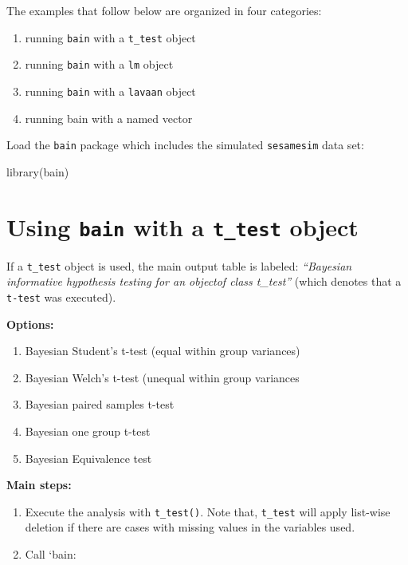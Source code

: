 \documentclass[
]{book}
\newenvironment{Shaded}{\begin{snugshade}}{\end{snugshade}}
\newcommand{\FunctionTok}[1]{\textcolor[rgb]{0.00,0.00,0.00}{#1}}
\newcommand{\NormalTok}[1]{#1}
\providecommand{\tightlist}{%
  \setlength{\itemsep}{0pt}\setlength{\parskip}{0pt}}
\begin{document}
The examples that follow below are organized in four categories:

\begin{enumerate}
\def\labelenumi{\arabic{enumi})}
\tightlist
\item
  running \texttt{bain} with a \texttt{t\_test} object
\item
  running \texttt{bain} with a \texttt{lm} object
\item
  running \texttt{bain} with a \texttt{lavaan} object
\item
  running bain with a named vector
\end{enumerate}

Load the \texttt{bain} package which includes the simulated \texttt{sesamesim} data set:

\begin{Shaded}
\begin{Highlighting}[]
\FunctionTok{library}\NormalTok{(bain)}
\end{Highlighting}
\end{Shaded}

\hypertarget{using-bain-with-a-t_test-object}{%
\section{\texorpdfstring{Using \texttt{bain} with a \texttt{t\_test} object}{Using bain with a t\_test object}}\label{using-bain-with-a-t_test-object}}

If a \texttt{t\_test} object is used, the main output table is
labeled: \emph{``Bayesian informative hypothesis testing for an objectof class t\_test''} (which denotes that a \texttt{t-test} was executed).

\textbf{Options:}

\begin{enumerate}
\def\labelenumi{\alph{enumi})}
\tightlist
\item
  Bayesian Student's t-test (equal within group variances)
\item
  Bayesian Welch's t-test (unequal within group variances
\item
  Bayesian paired samples t-test
\item
  Bayesian one group t-test
\item
  Bayesian Equivalence test
\end{enumerate}

\textbf{Main steps:}

\begin{enumerate}
\def\labelenumi{\arabic{enumi})}
\item
  Execute the analysis with \texttt{t\_test()}. Note that, \texttt{t\_test} will apply list-wise deletion if there are cases with missing values in the variables used.
\item
  Call `bain:
\end{enumerate}
\end{document}
